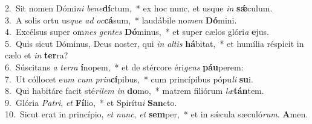 {2.~}Sit nomen Dómi\textit{ni} \textit{be}\textit{ne}\textbf{dí}ctum,~* ex hoc nunc, et usque \textit{in} \textbf{sǽ}culum.\\
{3.~}A solis ortu us\textit{que} \textit{ad} \textit{oc}\textbf{cá}sum,~* laudábile no\textit{men} \textbf{Dó}mini.\\
{4.~}Excélsus super om\textit{nes} \textit{gen}\textit{tes} \textbf{Dó}minus,~* et super cælos glóri\textit{a} \textbf{e}jus.\\
{5.~}Quis sicut Dóminus, Deus noster, qui \textit{in} \textit{al}\textit{tis} \textbf{há}bitat,~* et humília réspicit in cælo et \textit{in} \textbf{ter}ra?\\
{6.~}Súscitans \textit{a} \textit{ter}\textit{ra} \textbf{í}nopem,~* et de stércore éri\textit{gens} \textbf{páu}perem:\\
{7.~}Ut cóllocet e\textit{um} \textit{cum} \textit{prin}\textbf{cí}pibus,~* cum princípibus pópu\textit{li} \textbf{su}i.\\
{8.~}Qui habitáre facit sté\textit{ri}\textit{lem} \textit{in} \textbf{do}mo,~* matrem filiórum \textit{læ}\textbf{tán}tem.\\
{9.~}Glória \textit{Pa}\textit{tri}, \textit{et} \textbf{Fí}lio,~* et Spirítu\textit{i} \textbf{San}cto.\\
{10.~}Sicut erat in princípio, \textit{et} \textit{nunc}, \textit{et} \textbf{sem}per,~* et in sǽcula sæculó\textit{rum}. \textbf{A}men.\\
